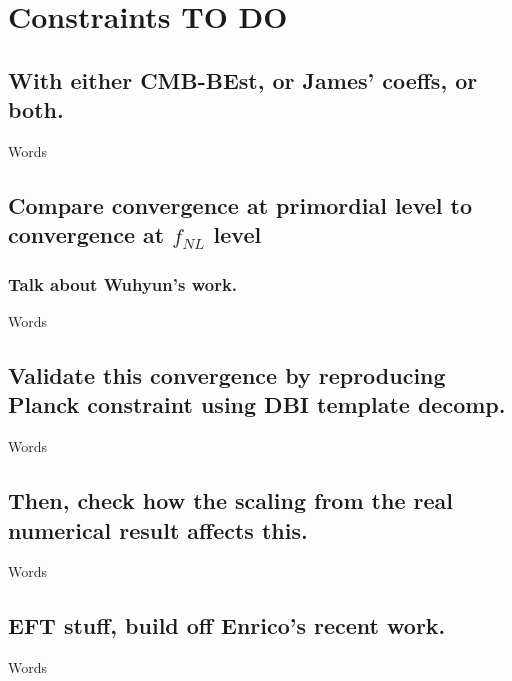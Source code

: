 %
\chapter{Constraints TO DO}
\section{With either CMB-BEst, or James' coeffs, or both.}
    Words
\section{Compare convergence at primordial level to convergence at $f_{NL}$ level}
    \subsection{Talk about Wuhyun's work.}
    Words
\section{Validate this convergence by reproducing Planck constraint using DBI template decomp.}
    Words
\section{Then, check how the scaling from the real numerical result affects this.}
    Words
\section{EFT stuff, build off Enrico's recent work.}
    Words
